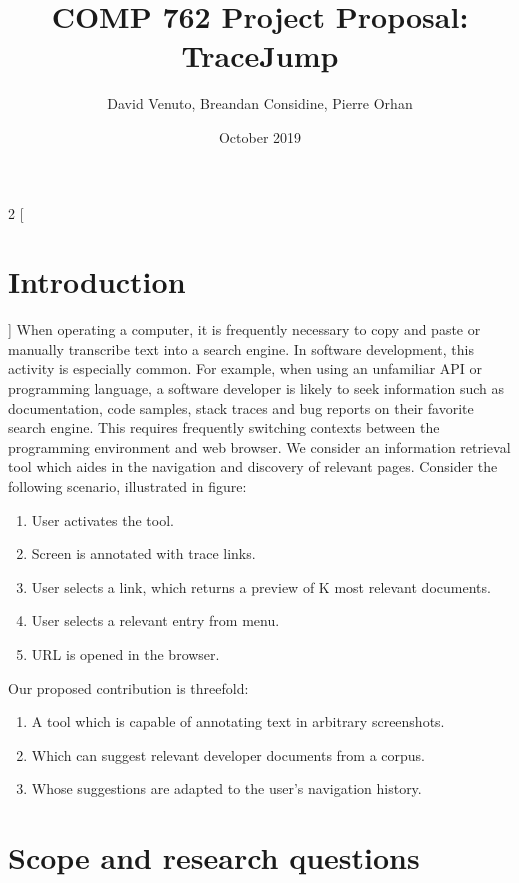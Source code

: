 \documentclass{article}
\title{COMP 762 Project Proposal: TraceJump}
\author{David Venuto, Breandan Considine, Pierre Orhan}
\date{October 2019}
\begin{document}
\maketitle
\begin{multicols}{2}
[
\section{Introduction}
]
When operating a computer, it is frequently necessary to copy and paste or manually transcribe text into a search engine. In software development, this activity is especially common. For example, when using an unfamiliar API or programming language, a software developer is likely to seek information such as documentation, code samples, stack traces and bug reports on their favorite search engine. This requires frequently switching contexts between the programming environment and web browser. We consider an information retrieval tool which aides in the navigation and discovery of relevant pages. Consider the following scenario, illustrated in figure:

\begin{enumerate}
    \item User activates the tool.
    \item Screen is annotated with trace links.
    \item User selects a link, which returns a preview of K most relevant documents.
    \item User selects a relevant entry from menu.
    \item URL is opened in the browser.
\end{enumerate}

Our proposed contribution is threefold:

\begin{enumerate}
\item A tool which is capable of annotating text in arbitrary screenshots.
\item Which can suggest relevant developer documents from a corpus.
\item Whose suggestions are adapted to the user's navigation history.
\end{enumerate}



\section{Scope and research questions}


\end{multicols}
\end{document}
